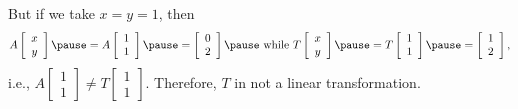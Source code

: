 \documentclass[pdf
,handout
]{beamer}
\begin{document}
{{\begin{example}
But if we take $x=y=1$, 
\pause then 
\[ A\left[\begin{array}{c} x \\ y \end{array}\right]
\pause
=A\left[\begin{array}{c} 1 \\ 1 \end{array}\right]
\pause
=\left[\begin{array}{c} 0 \\ 2 \end{array}\right]
\pause
\mbox{ while }
T\left[\begin{array}{c} x \\ y \end{array}\right]
\pause
=T\left[\begin{array}{c} 1 \\ 1 \end{array}\right]
\pause
=\left[\begin{array}{c} 1 \\ 2 \end{array}\right], \]
\pause
i.e., $A\left[\begin{array}{c} 1 \\ 1 \end{array}\right]
\neq T\left[\begin{array}{c} 1 \\ 1 \end{array}\right]$.
\pause
Therefore, $T$ in \alert{not} a linear transformation.
\end{example}
}
}
\end{document}

